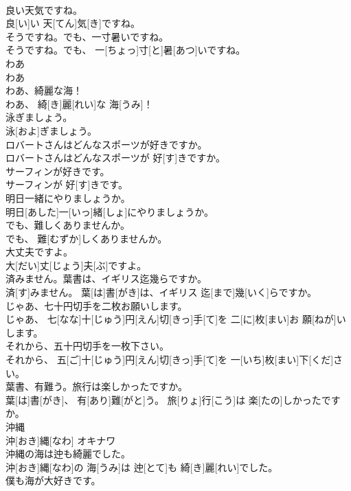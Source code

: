\documentclass[8pt]{extreport}
\begin{document}
\begin{CJK}{UTF8}{min}
\\	良い天気ですね。	
\\	良[い]い 天[てん]気[き]ですね。
\\	そうですね。でも、一寸暑いですね。	
\\	そうですね。でも、 一[ちょっ]寸[と]暑[あつ]いですね。
\\	わあ	
\\	わあ	
\\	わあ、綺麗な海！	
\\	わあ、 綺[き]麗[れい]な 海[うみ]！
\\	泳ぎましょう。	
\\	泳[およ]ぎましょう。
\\	ロバートさんはどんなスポーツが好きですか。	
\\	ロバートさんはどんなスポーツが 好[す]きですか。
\\	サーフィンが好きです。	
\\	サーフィンが 好[す]きです。
\\	明日一緒にやりましょうか。	
\\	明日[あした]一[いっ]緒[しょ]にやりましょうか。
\\	でも、難しくありませんか。	
\\	でも、 難[むずか]しくありませんか。
\\	大丈夫ですよ。	
\\	大[だい]丈[じょう]夫[ぶ]ですよ。
\\	済みません。葉書は、イギリス迄幾らですか。	
\\	済[す]みません。 葉[は]書[がき]は、イギリス 迄[まで]幾[いく]らですか。
\\	じゃあ、七十円切手を二枚お願いします。	
\\	じゃあ、 七[なな]十[じゅう]円[えん]切[きっ]手[て]を 二[に]枚[まい]お 願[ねが]いします。
\\	それから、五十円切手を一枚下さい。	
\\	それから、 五[ご]十[じゅう]円[えん]切[きっ]手[て]を 一[いち]枚[まい]下[くだ]さい。
\\	葉書、有難う。旅行は楽しかったですか。	
\\	葉[は]書[がき]、 有[あり]難[がと]う。 旅[りょ]行[こう]は 楽[たの]しかったですか。
\\	沖縄	
\\	沖[おき]縄[なわ]	オキナワ
\\	沖縄の海は迚も綺麗でした。	
\\	沖[おき]縄[なわ]の 海[うみ]は 迚[とて]も 綺[き]麗[れい]でした。
\\	僕も海が大好きです。	

\end{CJK}
\end{document}
